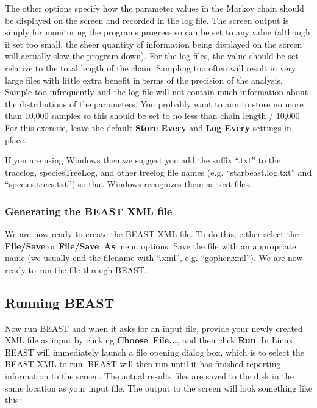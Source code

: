 \documentclass{article}
\begin{document}
The other options specify how the parameter values in the Markov chain should be
displayed on the screen and recorded in the log file. The screen output is
simply for monitoring the programs progress so can be set to any value (although
if set too small, the sheer quantity of information being displayed on the
screen will actually slow the program down). For the log files, the value should
be set relative to the total length of the chain. Sampling too often will result
in very large files with little extra benefit in terms of the precision of the
analysis. Sample too infrequently and the log file will not contain much
information about the distributions of the parameters. You probably want to aim
to store no more than 10,000 samples so this should be set to no less than chain
length / 10,000. For this exercise, leave the default \textbf{Store Every} and \textbf{Log Every}
settings in place.

If you are using Windows then we suggest you add the suffix ``.txt'' to the
tracelog, speciesTreeLog, and other treelog file names (e.g.
``starbeast.log.txt'' and ``species.trees.txt'') so that Windows recognizes them as text files.

\subsubsection*{Generating the BEAST XML file}

We are now ready to create the BEAST XML file. To do this, either select the
\textbf{File/Save} or \textbf{File/Save~As} menu options. Save the file with an
appropriate name (we usually end the filename with ``.xml'', e.g.
``gopher.xml''). We are now ready to run the file through BEAST.

\subsection*{Running BEAST}

Now run BEAST and when it asks for an input file, provide your newly created XML
file as input by clicking \textbf{Choose~File...}, and then click \textbf{Run}.
In Linux BEAST will immediately launch a file opening dialog box, which is to
select the BEAST XML to run. BEAST will then run until it has finished reporting
information to the screen. The actual results files are saved to the disk in the
same location as your input file. The output to the screen will look something
like this:
\end{document}
